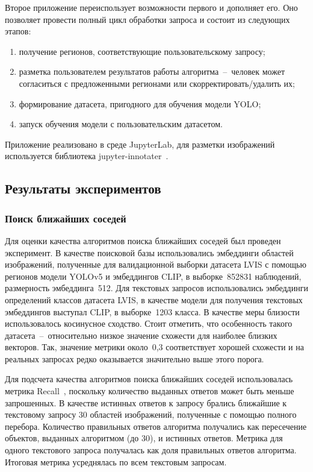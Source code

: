 \documentclass[a4paper,14pt]{article}
\begin{document}
    Второе приложение переиспользует возможности первого и дополняет его.
    Оно позволяет провести полный цикл обработки запроса и состоит из следующих этапов:
   	\begin{enumerate}
    	[1)]
    	\itemsep0em
    	\item получение регионов, соответствующие пользовательскому запросу;
    	\item разметка пользователем результатов работы алгоритма~--~человек может согласиться с предложенными регионами или скорректировать/удалить их;
    	\item формирование датасета, пригодного для обучения модели YOLO;
    	\item запуск обучения модели с пользовательским датасетом.
    \end{enumerate}

	Приложение реализовано в среде JupyterLab, для разметки изображений используется библиотека jupyter-innotater~\cite{jupyter_innotater}.
	
    \subsection{Результаты экспериментов}

    \subsubsection{Поиск ближайших соседей}

    Для оценки качества алгоритмов поиска ближайших соседей был проведен эксперимент.
    В качестве поисковой базы использовались эмбеддинги областей изображений, полученные для валидационной выборки датасета LVIS с помощью регионов модели YOLOv5 и эмбеддингов CLIP, в выборке~852831 наблюдений, размерность эмбеддинга~512.
    Для текстовых запросов использовались эмбеддинги определений классов датасета LVIS, в качестве модели для получения текстовых эмбеддингов выступал CLIP, в выборке~1203 класса.
    В качестве меры близости использовалось косинусное сходство.
    Стоит отметить, что особенность такого датасета~--~относительно низкое значение схожести для наиболее близких векторов.
    Так, значение метрики около~0,3 соответствует хорошей схожести и на реальных запросах редко оказывается значительно выше этого порога.

    Для подсчета качества алгоритмов поиска ближайших соседей использовалась метрика Recall~\cite{aumuller2020ann}, поскольку количество выданных ответов может быть меньше запрошенных.
    В качестве истинных ответов к запросу брались ближайшие к текстовому запросу 30 областей изображений, полученные с помощью полного перебора.
    Количество правильных ответов алгоритма получались как пересечение объектов, выданных алгоритмом (до 30), и истинных ответов.
    Метрика для одного текстового запроса получалась как доля правильных ответов алгоритма.
    Итоговая метрика усреднялась по всем текстовым запросам.
\end{document}
